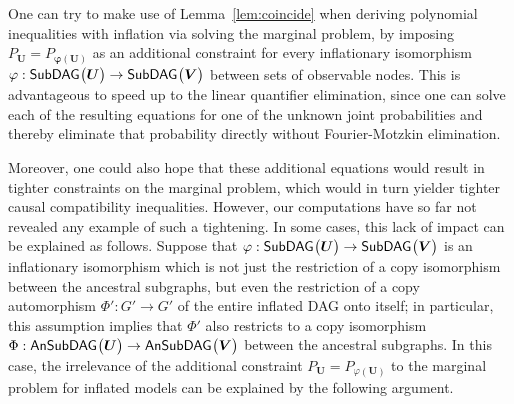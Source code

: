 {%


One can try to make use of Lemma~\ref{lem:coincide} when deriving polynomial inequalities with inflation via solving the marginal problem, by imposing $P_{\bm{U}} = P_{\bm{\varphi(\bm{U})}}$ as an additional constraint for every inflationary isomorphism $\varphi : {\operatorname{\mathsf{SubDAG}}_{}}\bigl\lparen\bm{U}\bigr\rparen\to{\operatorname{\mathsf{SubDAG}}_{}}\bigl\lparen\bm{V}\bigr\rparen$ between sets of observable nodes. This is advantageous to speed up to the linear quantifier elimination, since one can solve each of the resulting equations for one of the unknown joint probabilities and thereby eliminate that probability directly without Fourier-Motzkin elimination.

Moreover, one could also hope that these additional equations would result in tighter constraints on the marginal problem, which would in turn yielder tighter causal compatibility inequalities. However, our computations have so far not revealed any example of such a tightening. In some cases, this lack of impact can be explained as follows.
Suppose that $\varphi:{\operatorname{\mathsf{SubDAG}}_{}}\bigl\lparen\bm{U}\bigr\rparen\to{\operatorname{\mathsf{SubDAG}}_{}}\bigl\lparen\bm{V}\bigr\rparen$ is an inflationary isomorphism 
which is not just the restriction of a copy isomorphism between the ancestral subgraphs, but even the restriction of a copy automorphism 
$\Phi':G'\to G'$ of the entire inflated DAG onto itself; in particular, this assumption implies that $\Phi'$ also restricts to a copy isomorphism $\Phi:{\operatorname{\mathsf{AnSubDAG}}_{}}\bigl\lparen\bm{U}\bigr\rparen\to{\operatorname{\mathsf{AnSubDAG}}_{}}\bigl\lparen\bm{V}\bigr\rparen$ between the ancestral subgraphs. In this case, the irrelevance of the additional constraint $P_{\bm{U}} = P_{\varphi(\bm{U})}$ to the marginal problem for inflated models can be explained by the following argument. 

}
